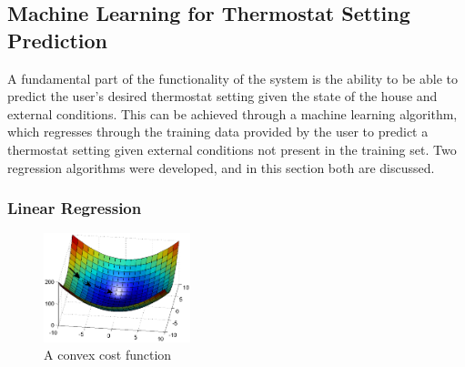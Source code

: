 \documentclass[10.5pt,a4paper,twoside]{report}   %
\begin{document}
\subsection{Machine Learning for Thermostat Setting Prediction}
A fundamental part of the functionality of the system is the ability to be able to predict the user's desired thermostat setting given the state of the house and external conditions. This can be achieved through a machine learning algorithm, which regresses through the training data provided by the user to predict a thermostat setting given external conditions not present in the training set. Two regression algorithms were developed, and in this section both are discussed.
\subsubsection{Linear Regression}
\begin{figure}
  \vspace{-40pt}
  \begin{center}
    \includegraphics[width=0.38\textwidth]{convexcurve.eps}
  \end{center}
  \vspace{-20pt}
  \caption{A convex cost function}
\label{fig:cvxcost}
  \vspace{-30pt}
\end{figure}
\end{document}
